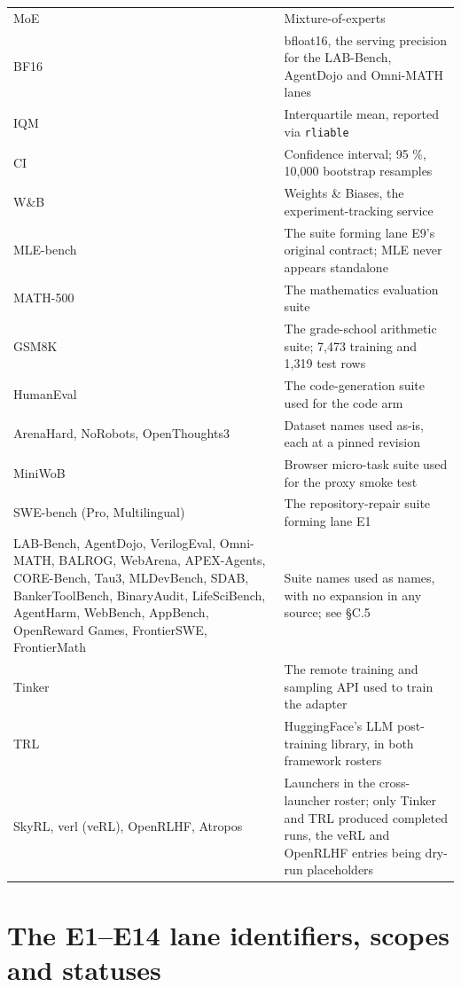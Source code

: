 \documentclass[12pt,a4paper]{report}
\providecommand{\real}[1]{#1}          %
\begin{document}
\begin{longtable}[]{@{}
  >{\raggedright\arraybackslash\hspace{0pt}}p{(\linewidth - 4\tabcolsep) * \real{0.5000}}
  >{\raggedright\arraybackslash\hspace{0pt}}p{(\linewidth - 4\tabcolsep) * \real{0.5000}}@{}}
MoE & Mixture-of-experts \\
BF16 & bfloat16, the serving precision for the LAB-Bench, AgentDojo and
Omni-MATH lanes \\
IQM & Interquartile mean, reported via \texttt{rliable} \\
CI & Confidence interval; 95 \%, 10,000 bootstrap resamples \\
W\&B & Weights \& Biases, the experiment-tracking service \\
MLE-bench & The suite forming lane E9's original contract; MLE never
appears standalone \\
MATH-500 & The mathematics evaluation suite \\
GSM8K & The grade-school arithmetic suite; 7,473 training and 1,319 test
rows \\
HumanEval & The code-generation suite used for the code arm \\
ArenaHard, NoRobots, OpenThoughts3 & Dataset names used as-is, each at a
pinned revision \\
MiniWoB & Browser micro-task suite used for the proxy smoke test \\
SWE-bench (Pro, Multilingual) & The repository-repair suite forming lane
E1 \\
LAB-Bench, AgentDojo, VerilogEval, Omni-MATH, BALROG, WebArena,
APEX-Agents, CORE-Bench, Tau3, MLDevBench, SDAB, BankerToolBench,
BinaryAudit, LifeSciBench, AgentHarm, WebBench, AppBench, OpenReward
Games, FrontierSWE, FrontierMath & Suite names used as names, with no
expansion in any source; see §C.5 \\
Tinker & The remote training and sampling API used to train the
adapter \\
TRL & HuggingFace's LLM post-training library, in both framework
rosters \\
SkyRL, verl (veRL), OpenRLHF, Atropos & Launchers in the cross-launcher
roster; only Tinker and TRL produced completed runs, the veRL and
OpenRLHF entries being dry-run placeholders \\
\end{longtable}

\section{The E1--E14 lane identifiers, scopes and
statuses}\label{the-e1e14-lane-identifiers-scopes-and-statuses}
\end{document}
